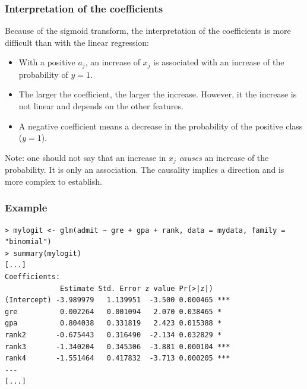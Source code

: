 \begin{frame}
\frametitle{Interpretation of the coefficients}
Because of the sigmoid transform, the interpretation of the coefficients is more difficult than with the linear regression:
\begin{itemize}
\item With a positive $a_j$, an increase of $x_j$ is associated with an increase of the probability of $y=1$. 
\item The larger the coefficient, the larger the increase. However, it the increase is not linear and depends on the other features.
\item A negative coefficient means a decrease in the probability of the positive class ($y=1$).
\end{itemize}
\small
Note: one should not say that an increase in $x_j$ {\it causes} an increase of the probability. It is only an association. The causality implies a direction and is more complex to establish.
\normalsize
\end{frame}
\begin{frame}[fragile]
\frametitle{Example}
\scriptsize
\begin{verbatim}
> mylogit <- glm(admit ~ gre + gpa + rank, data = mydata, family = "binomial")
> summary(mylogit)
[...]
Coefficients:
             Estimate Std. Error z value Pr(>|z|)    
(Intercept) -3.989979   1.139951  -3.500 0.000465 ***
gre          0.002264   0.001094   2.070 0.038465 *  
gpa          0.804038   0.331819   2.423 0.015388 *  
rank2       -0.675443   0.316490  -2.134 0.032829 *  
rank3       -1.340204   0.345306  -3.881 0.000104 ***
rank4       -1.551464   0.417832  -3.713 0.000205 ***
---
[...]
\end{verbatim}
\normalsize
\end{frame}
